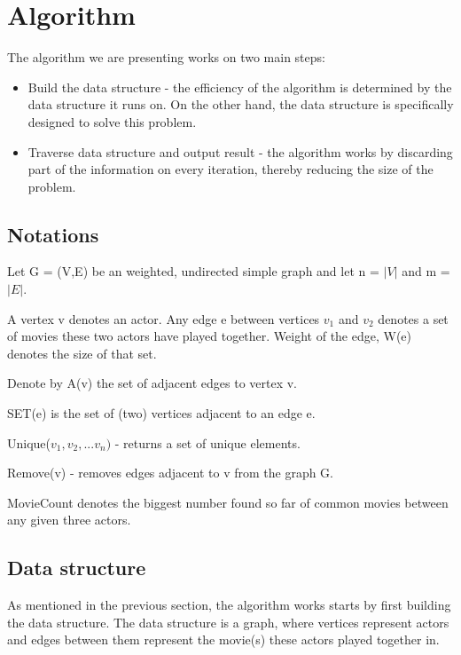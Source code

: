 \label{Algorithm}
\section{Algorithm}

The algorithm we are presenting works on two main steps:
\begin{itemize}
  \item Build the data structure - the efficiency of the algorithm is determined by the data structure it runs on. On the other hand, the data structure is specifically designed to solve this problem.
  \item Traverse data structure and output result - the algorithm works by  discarding part of the information on every iteration, thereby reducing the size of the problem.
\end{itemize} 

\subsection{Notations}
Let G = (V,E) be an weighted, undirected simple graph and let n = \(\lvert V\rvert\) and m = \(\lvert E\rvert\).

A vertex v denotes an actor. Any edge e between vertices \(v_1\) and \(v_2\) denotes a set of movies these two actors have played together. Weight of the edge, W(e) denotes the size of that set.

Denote by A(v) the set of adjacent edges to vertex v.

SET(e) is the set of (two) vertices adjacent to an edge e.

Unique(\(v_1, v_2,... v_n)\) - returns a set of unique elements.

Remove(v) - removes edges adjacent to v from the graph G.

MovieCount denotes the biggest number found so far of common movies between any given three actors.

\subsection{Data structure}
As mentioned in the previous section, the algorithm works starts by first building the data structure. The data structure is a graph, where vertices represent actors and edges between them represent the movie(s) these actors played together in. 

